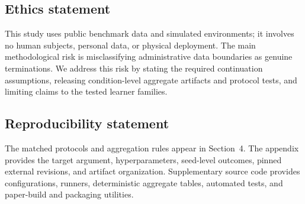 \subsection*{Ethics statement}

This study uses public benchmark data and simulated environments; it involves no human subjects, personal data, or physical deployment. The main methodological risk is misclassifying administrative data boundaries as genuine terminations. We address this risk by stating the required continuation assumptions, releasing condition-level aggregate artifacts and protocol tests, and limiting claims to the tested learner families.

\subsection*{Reproducibility statement}

The matched protocols and aggregation rules appear in Section~4. The appendix provides the target argument, hyperparameters, seed-level outcomes, pinned external revisions, and artifact organization. Supplementary source code provides configurations, runners, deterministic aggregate tables, automated tests, and paper-build and packaging utilities.
